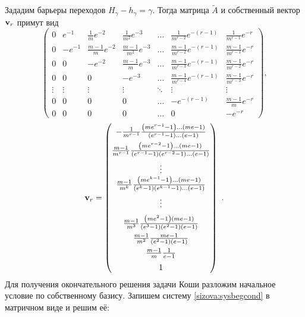 Зададим барьеры переходов $H_\gamma - h_\gamma = \gamma$. Тогда матрица $\tilde A$ и собственный вектор $\bold v_r$ примут вид
\begin{equation}
\begin{pmatrix}
0 & e^{-1} & \frac{1}{m}e^{-2} & \frac{1}{m^2}e^{-3} & \dots & \frac{1}{m^{r - 2}}e^{-\left(r - 1\right)} & \frac{1}{m^{r - 1}}e^{-r}\\[2mm]
0 & -e^{-1} & \frac{m - 1}{m} e^{-2} & \frac{m - 1}{m^2}e^{-3} & \dots & \frac{m - 1}{m^{r - 2}}e^{-\left(r - 1\right)} & \frac{m - 1}{m^{r - 1}}e^{-r}\\[2mm]
0 & 0 & -e^{-2} & \frac{m - 1}{m} e^{-3} & \dots & \frac{m - 1}{m^{r - 3}}e^{-\left(r - 1\right)} & \frac{m - 1}{m^{r - 2}}e^{-r}\\[2mm]
0 & 0 & 0 & -e^{-3} & \dots &  \frac{m - 1}{m^{r - 4}}e^{-\left(r - 1\right)} & \frac{m - 1}{m^{r - 3}}e^{-r}\\[2mm]
\vdots & \vdots & \vdots & \vdots & \ddots & \vdots & \vdots\\[2mm]
0 & 0 & 0 & 0 & \dots & -e^{-\left(r - 1\right)} & \frac{m - 1}{m}e^{-r}\\[2mm]
0 & 0 & 0 & 0 & \dots & 0 & -e^{-r}
\end{pmatrix},
\end{equation}
$$
\bold v_r = \begin{pmatrix}
-\frac{1}{m^{r - 1}}\frac{\left(me^{r - 1} - 1\right)\dots\left(me - 1\right)}{\left(e^{r - 1} - 1\right)\ldots\left(e - 1\right)} \\[2mm]
\frac{m - 1}{m^{r - 1}}\frac{\left(me^{r - 2} - 1\right)\ldots\left(me - 1\right)}{\left(e^{r - 1} - 1\right)\left(e^{r - 2} - 1\right)\ldots\left(e - 1\right)} \\[2mm]
\vdots \\
\frac{m - 1}{m^k}\frac{\left(me^{k - 1} - 1\right)\dots\left(me - 1\right)}{\left(e^{k} - 1\right)\left(e^{k - 1} - 1\right)\dots\left(e - 1\right)} \\[2mm]
\vdots \\[2mm]
\frac{m - 1}{m^3}\frac{\left(me^{2} - 1\right)\left(me - 1\right)}{\left(e^{3} - 1\right)\left(e^{2} - 1\right)\left(e - 1\right)} \\[2mm]
\frac{m - 1}{m^2} \frac{me - 1}{\left(e^{2} - 1\right)\left(e - 1\right)} \\[2mm]
\frac{m - 1}{m} \frac{1}{e - 1} \\[2mm]
1
\end{pmatrix}~.$$
Для получения окончательного решения задачи Коши разложим начальное условие по собственному базису. Запишем систему \eqref{sizova:sysbegcond} в матричном виде и решим её:
